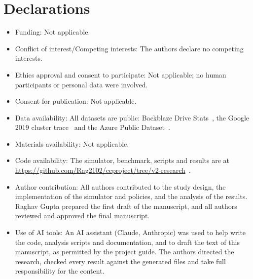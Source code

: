 \documentclass[pdflatex,sn-mathphys-num,iicol]{sn-jnl}
\newcommand{\repourl}{\url{https://github.com/Rag2102/ccproject/tree/v2-research}}
\theoremstyle{thmstyleone}%
\theoremstyle{thmstylethree}%
\begin{document}
\section*{Declarations}
\begin{itemize}
\item Funding: Not applicable.
\item Conflict of interest/Competing interests: The authors declare no competing interests.
\item Ethics approval and consent to participate: Not applicable; no human participants or
personal data were involved.
\item Consent for publication: Not applicable.
\item Data availability: All datasets are public: Backblaze Drive
Stats~\cite{backblaze2026drivestats}, the Google 2019 cluster trace~\cite{googleclusterdata2019}
and the Azure Public Dataset~\cite{azurepublicdataset}.
\item Materials availability: Not applicable.
\item Code availability: The simulator, benchmark, scripts and results are at
\repourl~\cite{ccproject2026repo}.
\item Author contribution: All authors contributed to the study design, the implementation of
the simulator and policies, and the analysis of the results. Raghav Gupta prepared the first
draft of the manuscript, and all authors reviewed and approved the final manuscript.
\item Use of AI tools: An AI assistant (Claude, Anthropic) was used to help write the code, analysis
scripts and documentation, and to draft the text of this manuscript, as permitted by the project
guide. The authors directed the research, checked every result against the generated files and take
full responsibility for the content.
\end{itemize}


\end{document}
